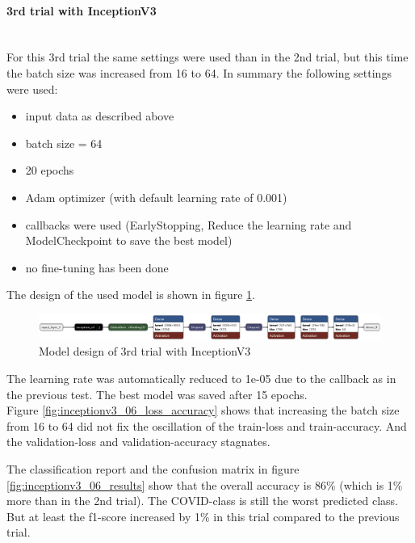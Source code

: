 \documentclass{article}
\begin{document}
\paragraph{3rd trial with InceptionV3}\mbox{}\\
For this 3rd trial the same settings were used than in the 2nd trial, but this time the batch size was increased from 16 to 64. In summary the following settings were used: 
\begin{itemize}
\item input data as described above
\item batch size = 64
\item 20 epochs 
\item Adam optimizer (with default learning rate of 0.001)
\item callbacks were used (EarlyStopping, Reduce the learning rate and ModelCheckpoint to save the best model)
\item no fine-tuning has been done
\end{itemize}

The design of the used model is shown in figure \ref{fig:inceptionv3_06.keras_model_design}.
\begin{figure}[ht] %
    \centering
    \includegraphics[width=1.0\linewidth]{inceptionv3_06.keras_model_design_nice.png}
    \caption{Model design of 3rd trial with InceptionV3}
    \label{fig:inceptionv3_06.keras_model_design}
\end{figure}

The learning rate was automatically reduced to 1e-05 due to the callback as in the previous test. The best model was saved after 15 epochs. \\
Figure \ref{fig:inceptionv3_06_loss_accuracy} shows that increasing the batch size from 16 to 64 did not fix the oscillation of the train-loss and train-accuracy. And the validation-loss and validation-accuracy stagnates. 

The classification report and the confusion matrix in figure \ref{fig:inceptionv3_06_results} show that the overall accuracy is 86\%  (which is 1\% more than in the 2nd trial). The COVID-class is still the worst predicted class. But at least the f1-score increased by 1\% in this trial compared to the previous trial. 
\end{document}
